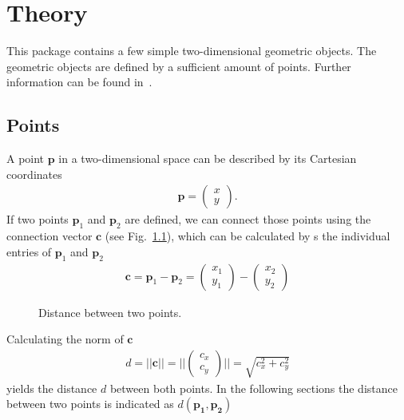 \chapter{Theory}
This package contains a few simple two-dimensional geometric objects. The geometric objects are defined by a sufficient amount of points. Further information can be found in~\cite{geometry}.
\section{Points}
A point $\mathbf{p}$ in a two-dimensional space can be described by its Cartesian coordinates
\begin{align}
    \mathbf{p} = \begin{pmatrix} x \\ y \end{pmatrix}.
\end{align}
If two points $\mathbf{p}_1$ and $\mathbf{p}_2$ are defined, we can connect those points using the connection vector $\mathbf{c}$ (see Fig.~\ref{fig:distance}), which can be calculated by s the individual entries of $\mathbf{p}_1$ and $\mathbf{p}_2$
\begin{align}
    \mathbf{c}  = \mathbf{p}_1 - \mathbf{p}_2 = \begin{pmatrix} x_1 \\ y_1 \end{pmatrix} - \begin{pmatrix} x_2 \\ y_2 \end{pmatrix}
\end{align}

\begin{figure}[h]
    \centering
    \caption{Distance between two points.}
    \label{fig:distance}
\end{figure}
Calculating the norm of $\mathbf{c}$
\begin{align}
    d = ||\mathbf{c}|| = || \begin{pmatrix} c_x \\ c_y \end{pmatrix} || = \sqrt{c_x^2 + c_y^2}
\end{align}
yields the distance $d$ between both points. In the following sections the distance between two points is indicated as $d(\mathbf{p_1},\mathbf{p_2})$

